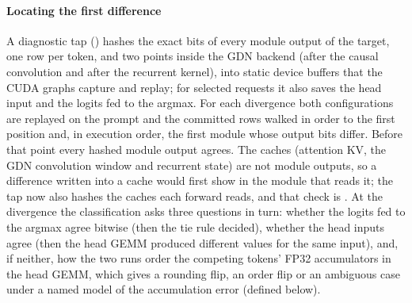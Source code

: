 \paragraph{Locating the first difference} A diagnostic tap () hashes the exact bits of every module output of the target, one row per token, and two points inside the GDN backend (after the causal convolution and after the recurrent kernel), into static device buffers that the CUDA graphs capture and replay; for selected requests it also saves the head input and the logits fed to the argmax. For each divergence both configurations are replayed on the prompt and the committed rows walked in order to the first position and, in execution order, the first module whose output bits differ. Before that point every hashed module output agrees. The caches (attention KV, the GDN convolution window and recurrent state) are not module outputs, so a difference written into a cache would first show in the module that reads it; the tap now also hashes the caches each forward reads, and that check is . At the divergence the classification asks three questions in turn: whether the logits fed to the argmax agree bitwise (then the tie rule decided), whether the head inputs agree (then the head GEMM produced different values for the same input), and, if neither, how the two runs order the competing tokens' FP32 accumulators in the head GEMM, which gives a rounding flip, an order flip or an ambiguous case under a named model of the accumulation error (defined below).

